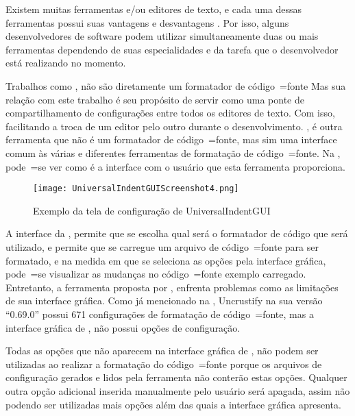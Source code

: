 Existem muitas ferramentas e\slash{}ou editores de texto,
e cada uma dessas ferramentas possui suas vantagens e
desvantagens \cite{prettyPrintingOfVisualSentences,anAbstractPrettyPrinter,improvingRefactoringSpeed}.
Por isso,
alguns desenvolvedores de software podem utilizar simultaneamente duas ou
mais ferramentas dependendo de suas especialidades e
da tarefa que o desenvolvedor está realizando no momento.

Trabalhos como ,
não são diretamente um formatador de código~=fonte Mas sua relação com este trabalho é seu propósito de servir como uma ponte de compartilhamento de configurações entre todos os editores de texto.
Com isso,
facilitando a troca de um editor pelo outro durante o desenvolvimento.
,
é outra ferramenta que não é um formatador de código~=fonte,
mas sim uma interface comum às várias e
diferentes ferramentas de formatação de código~=fonte.
Na ,
pode~=se ver como é a interface com o usuário que esta ferramenta proporciona.

\begin{figure}[!htb]
\caption{Exemplo da tela de configuração de UniversalIndentGUI}
\label{UniversalIndentGUIScreenshot4}
\centering
\texttt{[image: UniversalIndentGUIScreenshot4.png]}
\end{figure}

A interface da ,
permite que se escolha qual será o formatador de código que será utilizado,
e permite que se carregue um arquivo de código~=fonte para ser formatado,
e na medida em que se seleciona as opções pela interface gráfica,
pode~=se visualizar as mudanças no código~=fonte exemplo carregado.
Entretanto,
a ferramenta proposta por ,
enfrenta problemas como as limitações de sua interface gráfica.
Como já mencionado na ,
Uncrustify na sua versão ``0.69.0'' possui 671 configurações de formatação de código~=fonte,
mas a interface gráfica de ,
não possui  opções de configuração.

Todas as opções que não aparecem na interface gráfica de ,
não podem ser utilizadas ao realizar a formatação do código~=fonte porque os arquivos de configuração gerados e
lidos pela ferramenta não conterão estas opções.
Qualquer outra opção adicional inserida manualmente pelo usuário será apagada,
assim não podendo ser utilizadas mais opções além das quais a interface gráfica apresenta.

